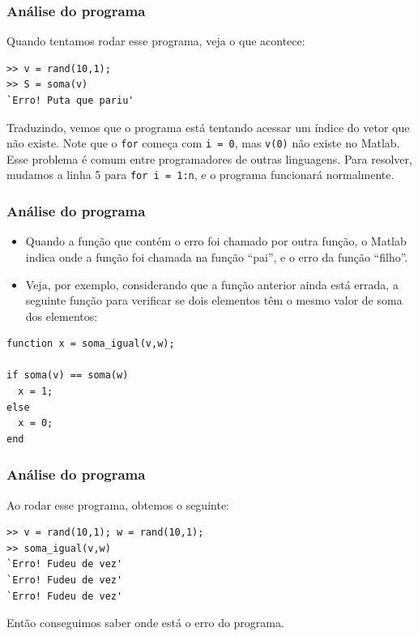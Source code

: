 \documentclass{beamer}
\newcommand{\ssiz}{\scriptsize}
\begin{document}
\begin{frame}[fragile]
\frametitle{An\'alise do programa}

Quando tentamos rodar esse programa, veja o que acontece:
{\scriptsize
\begin{verbatim}
>> v = rand(10,1);
>> S = soma(v)
`Erro! Puta que pariu'
\end{verbatim}
}
\pause

Traduzindo, vemos que o programa est\'a tentando acessar um \'indice do vetor que n\~ao existe. Note que o {\tt for} come\c{c}a com {\tt i = 0}, mas {\tt v(0)} n\~ao existe no Matlab. Esse problema \'e comum entre programadores de outras linguagens. Para resolver, mudamos a linha 5 para \verb+for i = 1:n+, e o programa funcionar\'a normalmente.
\end{frame}

\begin{frame}[fragile]
 \frametitle{An\'alise do programa}

\begin{itemize}
 \item<1-> Quando a fun\c{c}\~ao que cont\'em o erro foi chamado por outra fun\c{c}\~ao, o Matlab indica onde a fun\c{c}\~ao foi chamada na fun\c{c}\~ao ``pai'', e o erro da fun\c{c}\~ao ``filho''.
 \item<2-> Veja, por exemplo, considerando que a fun\c{c}\~ao anterior ainda est\'a errada, a seguinte fun\c{c}\~ao para verificar se dois elementos t\^em o mesmo valor de soma dos elementos:
\end{itemize}
\pause \pause
{\ssiz
\begin{verbatim}
function x = soma_igual(v,w);

if soma(v) == soma(w)
  x = 1;
else
  x = 0;
end
\end{verbatim}
}

\end{frame}

\begin{frame}[fragile]
\frametitle{An\'alise do programa}

Ao rodar esse programa, obtemos o seguinte:
\pause
{\ssiz
\begin{verbatim}
>> v = rand(10,1); w = rand(10,1);
>> soma_igual(v,w)
`Erro! Fudeu de vez'
`Erro! Fudeu de vez'
`Erro! Fudeu de vez'
\end{verbatim}
}
\pause

Ent\~ao conseguimos saber onde est\'a o erro do programa.

\end{frame}
\end{document}
